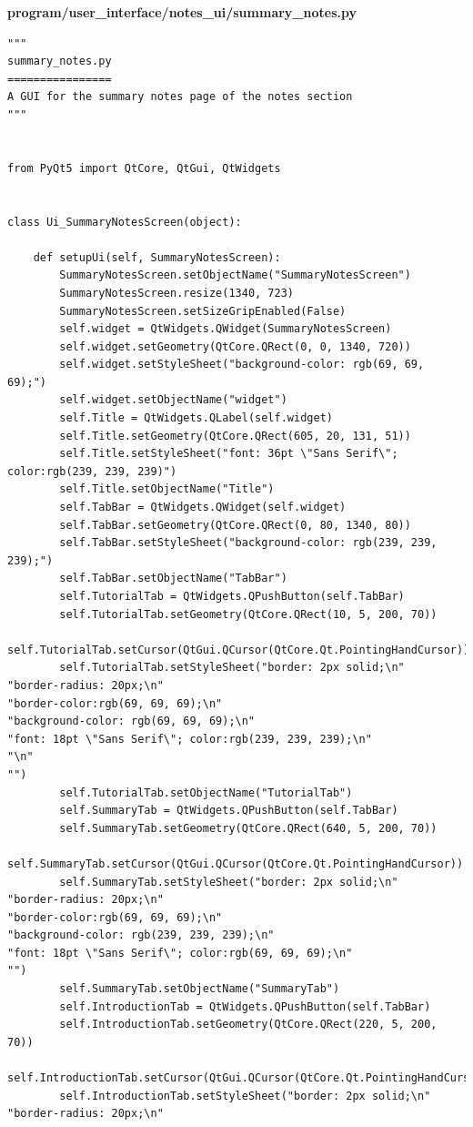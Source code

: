\documentclass[12pt]{article}
\begin{document}
\textbf{program/user\_interface/notes\_ui/summary\_notes.py}
\begin{lstlisting}
"""
summary_notes.py
================
A GUI for the summary notes page of the notes section
"""


from PyQt5 import QtCore, QtGui, QtWidgets


class Ui_SummaryNotesScreen(object):

    def setupUi(self, SummaryNotesScreen):
        SummaryNotesScreen.setObjectName("SummaryNotesScreen")
        SummaryNotesScreen.resize(1340, 723)
        SummaryNotesScreen.setSizeGripEnabled(False)
        self.widget = QtWidgets.QWidget(SummaryNotesScreen)
        self.widget.setGeometry(QtCore.QRect(0, 0, 1340, 720))
        self.widget.setStyleSheet("background-color: rgb(69, 69, 69);")
        self.widget.setObjectName("widget")
        self.Title = QtWidgets.QLabel(self.widget)
        self.Title.setGeometry(QtCore.QRect(605, 20, 131, 51))
        self.Title.setStyleSheet("font: 36pt \"Sans Serif\"; color:rgb(239, 239, 239)")
        self.Title.setObjectName("Title")
        self.TabBar = QtWidgets.QWidget(self.widget)
        self.TabBar.setGeometry(QtCore.QRect(0, 80, 1340, 80))
        self.TabBar.setStyleSheet("background-color: rgb(239, 239, 239);")
        self.TabBar.setObjectName("TabBar")
        self.TutorialTab = QtWidgets.QPushButton(self.TabBar)
        self.TutorialTab.setGeometry(QtCore.QRect(10, 5, 200, 70))
        self.TutorialTab.setCursor(QtGui.QCursor(QtCore.Qt.PointingHandCursor))
        self.TutorialTab.setStyleSheet("border: 2px solid;\n"
"border-radius: 20px;\n"
"border-color:rgb(69, 69, 69);\n"
"background-color: rgb(69, 69, 69);\n"
"font: 18pt \"Sans Serif\"; color:rgb(239, 239, 239);\n"
"\n"
"")
        self.TutorialTab.setObjectName("TutorialTab")
        self.SummaryTab = QtWidgets.QPushButton(self.TabBar)
        self.SummaryTab.setGeometry(QtCore.QRect(640, 5, 200, 70))
        self.SummaryTab.setCursor(QtGui.QCursor(QtCore.Qt.PointingHandCursor))
        self.SummaryTab.setStyleSheet("border: 2px solid;\n"
"border-radius: 20px;\n"
"border-color:rgb(69, 69, 69);\n"
"background-color: rgb(239, 239, 239);\n"
"font: 18pt \"Sans Serif\"; color:rgb(69, 69, 69);\n"
"")
        self.SummaryTab.setObjectName("SummaryTab")
        self.IntroductionTab = QtWidgets.QPushButton(self.TabBar)
        self.IntroductionTab.setGeometry(QtCore.QRect(220, 5, 200, 70))
        self.IntroductionTab.setCursor(QtGui.QCursor(QtCore.Qt.PointingHandCursor))
        self.IntroductionTab.setStyleSheet("border: 2px solid;\n"
"border-radius: 20px;\n"

\end{lstlisting}
\end{document}
